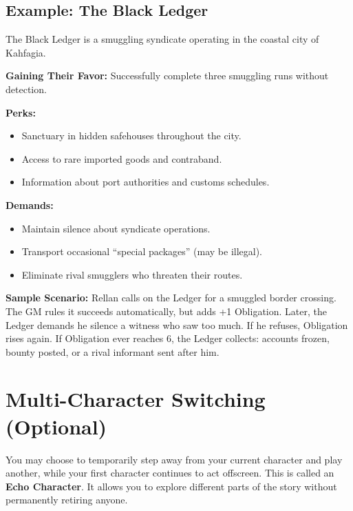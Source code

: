 \subsection{Example: The Black Ledger}
\label{sec:terrestrial-example}

The Black Ledger is a smuggling syndicate operating in the coastal city of Kahfagia.

\textbf{Gaining Their Favor:} Successfully complete three smuggling runs without detection.

\textbf{Perks:}
\begin{itemize}
    \item Sanctuary in hidden safehouses throughout the city.
    \item Access to rare imported goods and contraband.
    \item Information about port authorities and customs schedules.
\end{itemize}

\textbf{Demands:}
\begin{itemize}
    \item Maintain silence about syndicate operations.
    \item Transport occasional ``special packages'' (may be illegal).
    \item Eliminate rival smugglers who threaten their routes.
\end{itemize}

\textbf{Sample Scenario:} Rellan calls on the Ledger for a smuggled border crossing. The GM rules it succeeds automatically, but adds +1 Obligation. Later, the Ledger demands he silence a witness who saw too much. If he refuses, Obligation rises again. If Obligation ever reaches 6, the Ledger collects: accounts frozen, bounty posted, or a rival informant sent after him.

\section{Multi-Character Switching (Optional)}
\label{sec:multi-character-switching}

You may choose to temporarily step away from your current character and play another, while your first character continues to act offscreen. This is called an \textbf{Echo Character}. It allows you to explore different parts of the story without permanently retiring anyone.


